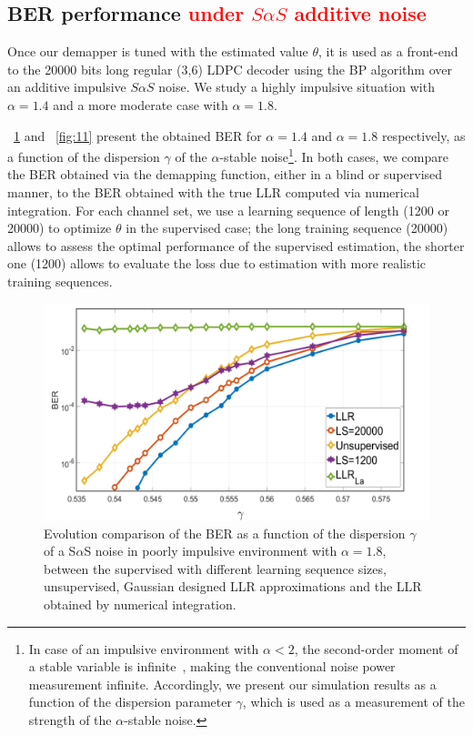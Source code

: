 \documentclass[a4paper]{IEEEtran}
\begin{document}
\subsection{BER performance \textcolor{red}{under $S\alpha S$ additive noise}}
\label{subsection:BERSaS}

Once our demapper is tuned with the estimated value
$\theta$, it is used as a front-end to the 20000 bits long
regular (3,6) LDPC decoder using the BP algorithm over an
additive impulsive $S\alpha S$ noise. We study a highly
impulsive situation with $\alpha= 1.4$ and a more moderate
case with $\alpha=1.8$.

\figurename~\ref{fig:10} and \figurename~\ref{fig:11}
present the obtained BER for $\alpha=1.4$ and $\alpha=1.8$
respectively, as a function of the dispersion $\gamma$ of
the $\alpha$-stable noise\footnote{In case of an impulsive
  environment with $\alpha < 2$, the second-order moment of
  a stable variable is infinite~\cite[Theorem 3]{NHJ-2008},
  making the conventional noise power measurement infinite.
  Accordingly, we present our simulation results as
  a function of the dispersion parameter $\gamma$, which is
  used as a measurement of the strength of the
  $\alpha$-stable noise.}. In both cases, we compare the BER
obtained via the demapping function, either in a blind or
supervised manner, to the BER obtained with the true LLR
computed via numerical integration. For each channel set, we
use a learning sequence of length (1200 or 20000) to
optimize $\theta$ in the supervised case; the long training
sequence (20000) allows to assess the optimal performance of
the supervised estimation, the shorter one (1200) allows to
evaluate the loss due to estimation with more realistic
training sequences.

\begin{figure}
  \centering \includegraphics[width=\linewidth]{fig-10}
  \caption{Evolution comparison of the BER as a function of
    the dispersion $\gamma$ of a S$\alpha$S noise in poorly
    impulsive environment with $\alpha=1.8$, between the
    supervised with different learning sequence sizes,
    unsupervised, Gaussian designed LLR approximations and
    the LLR obtained by numerical integration.}
  \label{fig:10}
\end{figure}
\end{document}
